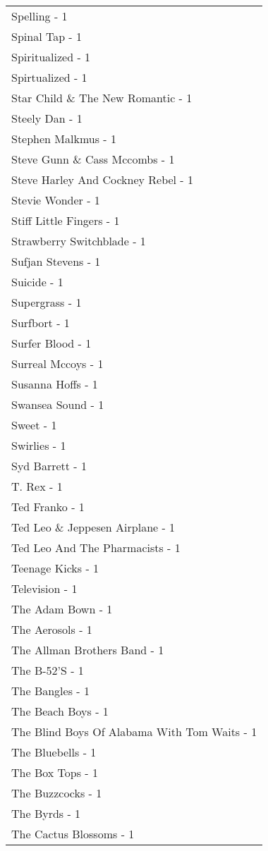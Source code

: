 \documentclass[
]{article}
\begin{document}
\begin{longtable}{l}
Spelling - 1 \\ 
Spinal Tap - 1 \\ 
Spiritualized - 1 \\ 
Spirtualized - 1 \\ 
Star Child \& The New Romantic - 1 \\ 
Steely Dan - 1 \\ 
Stephen Malkmus - 1 \\ 
Steve Gunn \& Cass Mccombs - 1 \\ 
Steve Harley And Cockney Rebel - 1 \\ 
Stevie Wonder - 1 \\ 
Stiff Little Fingers - 1 \\ 
Strawberry Switchblade - 1 \\ 
Sufjan Stevens - 1 \\ 
Suicide - 1 \\ 
Supergrass - 1 \\ 
Surfbort - 1 \\ 
Surfer Blood - 1 \\ 
Surreal Mccoys - 1 \\ 
Susanna Hoffs - 1 \\ 
Swansea Sound - 1 \\ 
Sweet - 1 \\ 
Swirlies - 1 \\ 
Syd Barrett - 1 \\ 
T. Rex - 1 \\ 
Ted Franko - 1 \\ 
Ted Leo \& Jeppesen Airplane - 1 \\ 
Ted Leo And The Pharmacists - 1 \\ 
Teenage Kicks - 1 \\ 
Television - 1 \\ 
The Adam Bown - 1 \\ 
The Aerosols - 1 \\ 
The Allman Brothers Band - 1 \\ 
The B-52'S - 1 \\ 
The Bangles - 1 \\ 
The Beach Boys - 1 \\ 
The Blind Boys Of Alabama With Tom Waits - 1 \\ 
The Bluebells - 1 \\ 
The Box Tops - 1 \\ 
The Buzzcocks - 1 \\ 
The Byrds - 1 \\ 
The Cactus Blossoms - 1 \\ 

\end{longtable}
\end{document}
